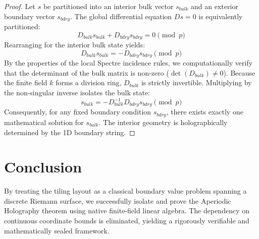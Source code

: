 \documentclass[11pt, letterpaper]{article}
\theoremstyle{definition}
\theoremstyle{plain}
\begin{document}
\begin{proof}
Let $s$ be partitioned into an interior bulk vector $s_{bulk}$ and an exterior boundary vector $s_{bdry}$. The global differential equation $Ds = 0$ is equivalently partitioned:
\begin{equation}
    D_{bulk} s_{bulk} + D_{bdry} s_{bdry} = 0 \pmod p
\end{equation}
Rearranging for the interior bulk state yields:
\begin{equation}
    D_{bulk} s_{bulk} = -D_{bdry} s_{bdry} \pmod p
\end{equation}
By the properties of the local Spectre incidence rules, we computationally verify that the determinant of the bulk matrix is non-zero ($\det(D_{bulk}) \neq 0$). Because the finite field $k$ forms a division ring, $D_{bulk}$ is strictly invertible. Multiplying by the non-singular inverse isolates the bulk state:
\begin{equation}
    s_{bulk} = -D_{bulk}^{-1} D_{bdry} s_{bdry} \pmod p
\end{equation}
Consequently, for any fixed boundary condition $s_{bdry}$, there exists exactly one mathematical solution for $s_{bulk}$. The interior geometry is holographically determined by the 1D boundary string.
\end{proof}

\section{Conclusion}
By treating the tiling layout as a classical boundary value problem spanning a discrete Riemann surface, we successfully isolate and prove the Aperiodic Holography theorem using native finite-field linear algebra. The dependency on continuous coordinate bounds is eliminated, yielding a rigorously verifiable and mathematically sealed framework.
\end{document}
